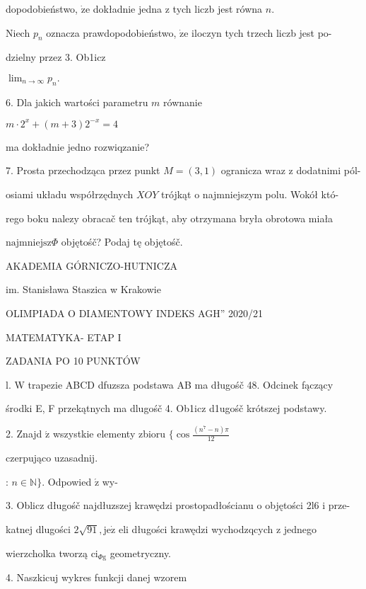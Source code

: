 \documentclass[a4paper,12pt]{article}
\begin{document}
dopodobieństwo, $\dot{\mathrm{z}}\mathrm{e}$ dokładnie jedna z tych liczb jest równa $n.$

Niech $p_{n}$ oznacza prawdopodobieństwo, $\dot{\mathrm{z}}\mathrm{e}$ iloczyn tych trzech liczb jest po-

dzielny przez 3. Ob1icz

$\displaystyle \lim_{n\rightarrow\infty}p_{n}.$

6. Dla jakich wartości parametru $m$ równanie

$m\cdot 2^{x}+(m+3)2^{-x}=4$

ma dokładnie jedno rozwiqzanie?

7. Prosta przechodząca przez punkt $M=(3,1)$ ogranicza wraz z dodatnimi pól-

osiami układu współrzędnych $XOY$ trójkąt o najmniejszym polu. Wokół któ-

rego boku nalezy obracač ten trójkąt, aby otrzymana bryła obrotowa miała

$\mathrm{n}\mathrm{a}\mathrm{j}\mathrm{m}\mathrm{n}\mathrm{i}\mathrm{e}\mathrm{j}\mathrm{s}\mathrm{z}\Phi$ objętośč? Podaj tę objętośč.






AKADEMIA GÓRNICZO-HUTNICZA

im. Stanisława Staszica w Krakowie

OLIMPIADA O DIAMENTOWY INDEKS AGH'' 2020/21

MATEMATYKA- ETAP I

ZADANIA PO 10 PUNKTÓW

l. W trapezie ABCD dfuzsza podstawa AB ma długośč 48. Odcinek fączący

środki E, F przekątnych ma dlugośč 4. Ob1icz d1ugośč krótszej podstawy.

2. Znajd $\acute{\mathrm{z}}$ wszystkie elementy zbioru $\displaystyle \{\cos\frac{(n^{7}-n)\pi}{12}$

czerpująco uzasadnij.

: $n\in \mathbb{N}\}.$ Odpowied $\acute{\mathrm{z}}$ wy-

3. Oblicz długośč najdłuzszej krawędzi prostopadłościanu o objętości 2l6 i prze-

katnej dlugości $2\sqrt{91}, \mathrm{j}\mathrm{e}\dot{\mathrm{z}}$ eli długości krawędzi wychodzqcych z jednego

wierzcholka tworzą $\mathrm{c}\mathrm{i}_{\Phi \mathrm{g}}$ geometryczny.

4. Naszkicuj wykres funkcji danej wzorem
\end{document}
